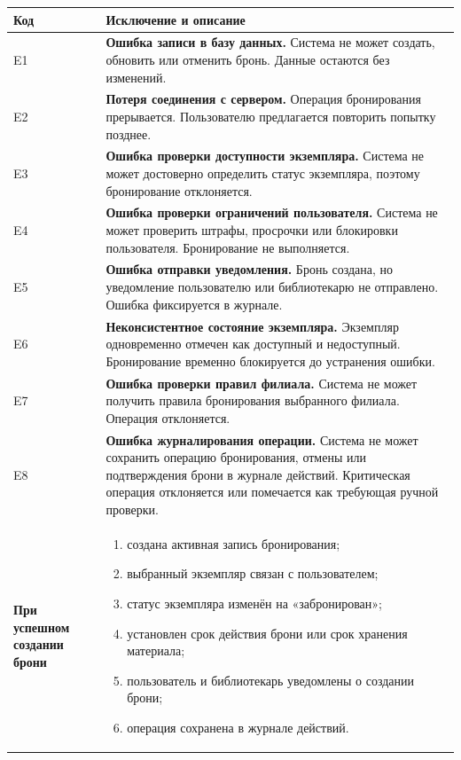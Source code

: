 \documentclass[12pt,a4paper]{article}
\begin{document}
\begin{xltabular}{\textwidth}{
				|>{\raggedright\arraybackslash}p{2.7cm}
				|>{\raggedright\arraybackslash}X|
			}
			\textbf{Код} & \textbf{Исключение и описание} \\
			\hline
			
			E1 &
			\textbf{Ошибка записи в базу данных.}
			Система не может создать, обновить или отменить бронь. Данные
			остаются без изменений. \\
			\hline
			
			E2 &
			\textbf{Потеря соединения с сервером.}
			Операция бронирования прерывается. Пользователю предлагается
			повторить попытку позднее. \\
			\hline
			
			E3 &
			\textbf{Ошибка проверки доступности экземпляра.}
			Система не может достоверно определить статус экземпляра, поэтому
			бронирование отклоняется. \\
			\hline
			
			E4 &
			\textbf{Ошибка проверки ограничений пользователя.}
			Система не может проверить штрафы, просрочки или блокировки
			пользователя. Бронирование не выполняется. \\
			\hline
			
			E5 &
			\textbf{Ошибка отправки уведомления.}
			Бронь создана, но уведомление пользователю или библиотекарю не
			отправлено. Ошибка фиксируется в журнале. \\
			\hline
			
			E6 &
			\textbf{Неконсистентное состояние экземпляра.}
			Экземпляр одновременно отмечен как доступный и недоступный.
			Бронирование временно блокируется до устранения ошибки. \\
			\hline
			
			E7 &
			\textbf{Ошибка проверки правил филиала.}
			Система не может получить правила бронирования выбранного филиала.
			Операция отклоняется. \\
			\hline
			
			E8 &
			\textbf{Ошибка журналирования операции.}
			Система не может сохранить операцию бронирования, отмены или
			подтверждения брони в журнале действий. Критическая операция
			отклоняется или помечается как требующая ручной проверки. \\
			\hline
			
			
			\textbf{При успешном создании брони} &
			\begin{enumerate}
				\item создана активная запись бронирования;
				\item выбранный экземпляр связан с пользователем;
				\item статус экземпляра изменён на «забронирован»;
				\item установлен срок действия брони или срок хранения материала;
				\item пользователь и библиотекарь уведомлены о создании брони;
				\item операция сохранена в журнале действий.
			\end{enumerate} \\
			\hline
			

\end{xltabular}
\end{document}
